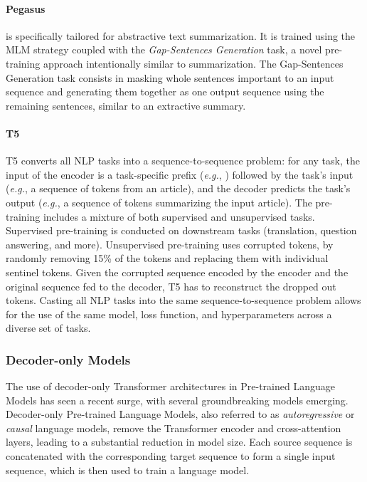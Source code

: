 \paragraph{Pegasus} \citep{zhang2020pegasus} is specifically tailored for abstractive text summarization. It is trained using the \ac{MLM} strategy coupled with the \textit{Gap-Sentences Generation} task, a novel pre-training approach intentionally similar to summarization. The Gap-Sentences Generation task consists in masking whole sentences important to an input sequence and generating them together as one output sequence using the remaining sentences, similar to an extractive summary. 

\paragraph{T5} \ac{T5} \citep{raffel2020exploring} converts all \ac{NLP} tasks into a sequence-to-sequence problem: for any task, the input of the encoder is a task-specific prefix (\textit{e.g.}, ) followed by the task's input (\textit{e.g.}, a sequence of tokens from an article), and the decoder predicts the task's output (\textit{e.g.}, a sequence of tokens summarizing the input article). The pre-training includes a mixture of both supervised and unsupervised tasks. Supervised pre-training is conducted on downstream tasks (translation, question answering, and more). Unsupervised pre-training uses corrupted tokens, by randomly removing 15\% of the tokens and replacing them with individual sentinel tokens. Given the corrupted sequence encoded by the encoder and the original sequence fed to the decoder, \ac{T5} has to reconstruct the dropped out tokens. Casting all \ac{NLP} tasks into the same sequence-to-sequence problem allows for the use of the same model, loss function, and hyperparameters across a diverse set of tasks. 

\subsubsection{Decoder-only Models}

The use of decoder-only Transformer architectures in Pre-trained Language Models has seen a recent surge, with several groundbreaking models \citep{radford2018improving, brown2020language, ouyang2022training, touvron2023llama} emerging. Decoder-only Pre-trained Language Models, also referred to as \textit{autoregressive} or \textit{causal} language models, remove the Transformer encoder and cross-attention layers, leading to a substantial reduction in model size. Each source sequence is concatenated with the corresponding target sequence to form a single input sequence, which is then used to train a language model. 

